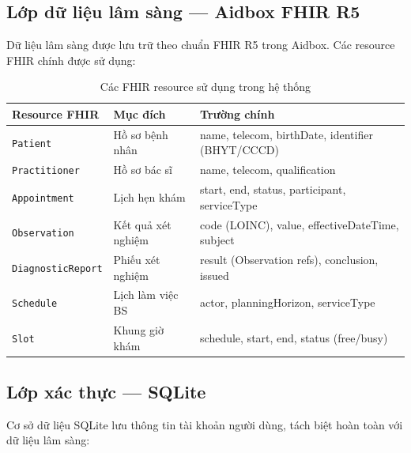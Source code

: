 \documentclass[oneside, a4paper]{book}
\theoremstyle{plain}
\theoremstyle{plain}
\theoremstyle{definition}
\theoremstyle{remark}
\begin{document}
\subsection{Lớp dữ liệu lâm sàng --- Aidbox FHIR R5}

Dữ liệu lâm sàng được lưu trữ theo chuẩn FHIR R5 trong Aidbox. Các resource FHIR chính được sử dụng:

\begin{table}[H]
\centering
\begin{tabular}{|l|l|p{7cm}|}
\hline
\textbf{Resource FHIR} & \textbf{Mục đích} & \textbf{Trường chính} \\
\hline
\texttt{Patient} & Hồ sơ bệnh nhân & name, telecom, birthDate, identifier (BHYT/CCCD) \\
\texttt{Practitioner} & Hồ sơ bác sĩ & name, telecom, qualification \\
\texttt{Appointment} & Lịch hẹn khám & start, end, status, participant, serviceType \\
\texttt{Observation} & Kết quả xét nghiệm & code (LOINC), value, effectiveDateTime, subject \\
\texttt{DiagnosticReport} & Phiếu xét nghiệm & result (Observation refs), conclusion, issued \\
\texttt{Schedule} & Lịch làm việc BS & actor, planningHorizon, serviceType \\
\texttt{Slot} & Khung giờ khám & schedule, start, end, status (free/busy) \\
\hline
\end{tabular}
\caption{Các FHIR resource sử dụng trong hệ thống}
\label{tab:fhir-resources}
\end{table}

\subsection{Lớp xác thực --- SQLite}

Cơ sở dữ liệu SQLite lưu thông tin tài khoản người dùng, tách biệt hoàn toàn với dữ liệu lâm sàng:
\end{document}

